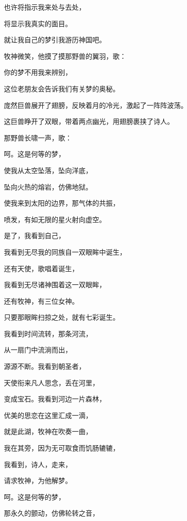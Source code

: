 \documentclass[UTF8]{article}
\begin{document}
\par 也许将指示我来处与去处，
\par 将显示我真实的面目。
\par 就让我自己的梦引我游历神国吧。
\\[0.6cm]
\par 牧神微笑，他摸了摸那野兽的翼羽，歌：
\\[0.6cm]
\par 你的梦不用我来辨别，
\par 这位老朋友会告诉我们有关梦的奥秘。
\\[0.6cm]
\par 庞然巨兽展开了翅膀，反映着月的冷光，激起了一阵阵波荡。
\par 这巨兽睁开了双眼，带着两点幽光，用翅膀裹挟了诗人。
\\[0.6cm]
\par 那野兽长啸一声，歌：
\\[0.6cm]
\par 呵。这是何等的梦，
\par 使我从太空坠落，坠向洋底，
\par 坠向火热的熔岩，仿佛地狱。
\par 使我来到太阳的边界，那气体的共振，
\par 喷发，有如无限的星火射向虚空。
\par 是了，我看到自己，
\par 我看到无尽我的同族自一双眼眸中诞生，
\par 还有天使，歌唱着诞生，
\par 我看到无尽诸神围着这一双眼眸，
\par 还有牧神，有三位女神。
\par 只要那眼眸扫掠之处，就有七彩诞生。
\par 我看到时间流转，那条河流，
\par 从一扇门中流淌而出，
\par 源源不断。我看到朝圣者，
\par 天使衔来凡人思念，丢在河里，
\par 变成宝石。我看到河边一片森林，
\par 优美的思恋在这里汇成一滴，
\par 就是此湖，牧神在吹奏一曲，
\par 我在其旁，因为无可取食而饥肠辘辘，
\par 我看到，诗人，走来，
\par 请求牧神，为他解梦。
\par 呵。这是何等的梦，
\par 那永久的颤动，仿佛轮转之音，
\end{document}
